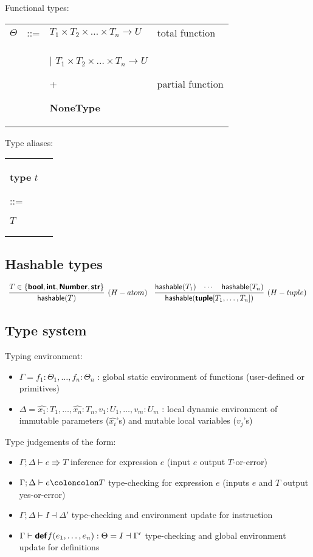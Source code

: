\documentclass[a4paper]{article}
\newcommand{\kw}[1]{\textsf{\textbf{#1}}}
\newcommand{\code}[1]{\begin{sffamily}#1\end{sffamily}}
\newcommand{\colcol}{\coloncolon}
\newcommand{\yield}{\Rrightarrow}
\newcommand{\fun}[1]{\mathsf{#1}}
\begin{document}
Functional types:

\begin{tabular}{llll}
$\Theta$ & ::= & $T_1 \times T_2 \times \ldots \times T_n \rightarrow U$ & total function \\
  & & | $T_1 \times T_2 \times \ldots \times T_n \rightarrow U$ \code{+} \kw{NoneType} & partial function \\
\end{tabular}

Type aliases:

\begin{tabular}{ll}
\kw{type} $t$ \code{::=} $T$
\end{tabular}

\subsection{Hashable types}


$$\begin{array}{cc}
\infer[(H-atom)]{\fun{hashable}(T)}{T \in \{\kw{bool},\kw{int},\kw{Number},\kw{str}\}}
&
\infer[(H-tuple)]{\fun{hashable}(\kw{tuple}[T_1,\ldots,T_n])}{\fun{hashable}(T_1) & \cdots & \fun{hashable}(T_n)}
\end{array}
$$

\subsection{Type system}

Typing environment:

\begin{itemize}
  \item $\Gamma = f_1:\Theta_1,\ldots,f_n:\Theta_n$ : global static environment of functions (user-defined or primitives)
  \item $\Delta = \widehat{x_1}:T_1,\ldots,\widehat{x_n}:T_n,v_1:U_1,\ldots,v_m:U_m$ : local dynamic environment of immutable parameters ($\widehat{x_i}$'s) and mutable local variables ($v_j$'s)
\end{itemize}

Type judgements of the form:

\begin{itemize}
\item $\Gamma;\Delta \vdash e \yield T$ \quad inference for expression $e$ (input $e$ output $T$-or-error)
\item $\Gamma;\Delta \vdash e \colcol T$ \quad type-checking for expression $e$ (inputs $e$ and $T$ output yes-or-error)
\item $\Gamma;\Delta \vdash I \dashv \Delta'$ \quad type-checking and environment update for instruction
\item $\Gamma \vdash \kw{def} f(e_1,\ldots,e_n) : \Theta = I \dashv \Gamma'$ \quad type-checking and global environment update for definitions
\end{itemize}
\end{document}
